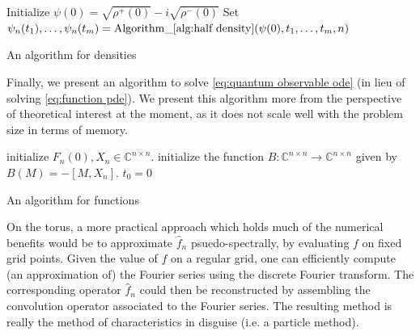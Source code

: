 \documentclass[12pt]{amsart}
\DeclareMathOperator{\OdeSolve}{OdeSolve}
\begin{document}
\begin{algorithm}[H] 
	Initialize $\psi(0) =  \sqrt{\rho^{+}(0)} - i \sqrt{\rho^{-}(0)}$\;
	Set $\psi_{n}(t_{1}),\dots,\psi_{n}(t_{m}) =  \operatorname{ Algorithm\_ \ref{alg:half density} }( \psi(0) , t_{1} , \dots,t_{m}, n )$\;
	\caption{An algorithm for densities} \label{alg:density}
\end{algorithm}


Finally, we present an algorithm to solve \eqref{eq:quantum observable ode} (in lieu of solving \eqref{eq:function pde}).
We present this algorithm more from the perspective of theoretical interest at the moment, as it does not scale well with the problem size in terms of memory.

\begin{algorithm}[H]
	
	initialize $F_{n}(0), X_{n} \in \mathbb{C}^{n \times n}$.\;
	initialize the function $B: \mathbb{C}^{n \times n} \to \mathbb{C}^{n \times n}$
	given by $B(M) = - [M , X_{n}]$.\;
	$t_{0} = 0$\;
	\For{ $k = 1 ,\dots, m $}{
		$F_{n}(t_{k}) = \OdeSolve( B , F_{n}(t_{k-1}) , t_{k})$\;
	}
	\caption{An algorithm for functions} \label{alg:function}
\end{algorithm}

On the torus, a more practical approach which holds much of the numerical benefits would be to approximate $\hat{f}_{n}$ psuedo-spectrally,
by evaluating $f$ on fixed grid points.
Given the value of $f$ on a regular grid, one can efficiently compute (an approximation of) the Fourier series using the discrete Fourier transform.
The corresponding operator $\hat{f}_{n}$ could then be reconstructed by assembling the convolution operator associated to the Fourier series.
The resulting method is really the method of characteristics in disguise (i.e. a particle method).
\end{document}
